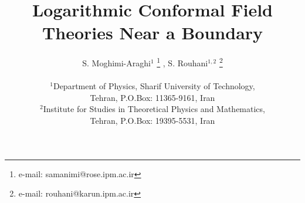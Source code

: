 \documentclass[a4paper,11pt]{article}
\setlength{\parindent}{0.22in}
\setlength{\textheight}{8.4in}
\setlength{\textwidth}{5.6in}
\setlength{\topmargin}{-.3in}
\setlength{\evensidemargin}{0.3in}
\setlength{\oddsidemargin}{0.3in}

\title{Logarithmic Conformal Field Theories Near a Boundary}
\author{S. Moghimi-Araghi$^1$ \footnote{e-mail: samanimi@rose.ipm.ac.ir} ,
S. Rouhani$^{1,2}$ \footnote{e-mail: rouhani@karun.ipm.ac.ir}\\
\\
$^1$Department of Physics, Sharif University of Technology,\\
Tehran, P.O.Box: 11365-9161, Iran\\
$^2$Institute for Studies in Theoretical Physics and Mathematics,\\
Tehran, P.O.Box: 19395-5531, Iran}
\maketitle

\begin{abstract}
We consider logarithmic conformal field theories near a boundary and derive the
general form of one and two point functions. We obtain results for arbitrary 
and two dimensions. Application to two dimensional magnetohydrodynamics is discussed.
\end{abstract}

\section{Introduction}

Gurarie has pointed out \cite{Gur} that it is possible to construct consistent 
conformal field theories which have logarithmic terms in their correlation functions.
In these theories representation of the Virasoro algebra is not diagonalizable.
Logarithmic conformal field theories (LCFTs) contain logarithmic operators 
which have logarithms as well as powers in their operator product expansion.
Such operators do not appear in unitary CFTs. However this does not mean that they are not
relevant. By now a large number of examples of the applications of such theories 
have been found. For some examples see citations in \cite{Flohr sing}.
Extensive work has been done on the structure of LCFTs \cite{Flohr sing,GK,RAK}, although a lot
remains to be worked out.

